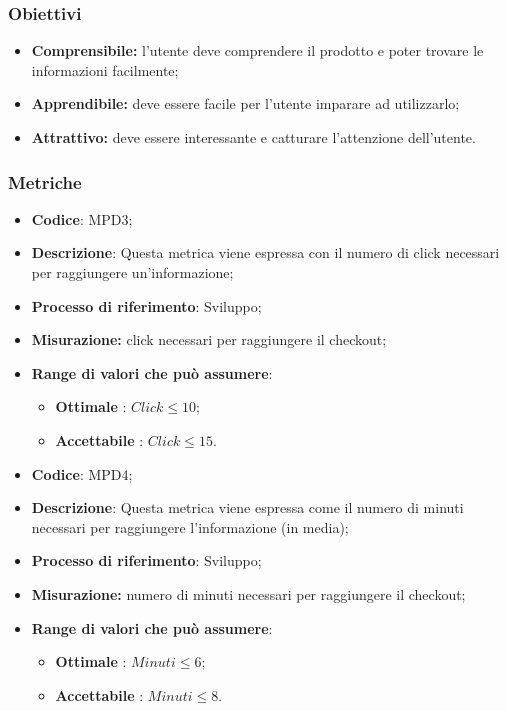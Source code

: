 \subsubsection{Obiettivi}
\begin {itemize}
	\item \textbf{Comprensibile:} l'utente deve comprendere il prodotto e poter trovare le informazioni facilmente;
	\item \textbf{Apprendibile:} deve essere facile per l'utente imparare ad utilizzarlo;
	\item \textbf{Attrattivo:} deve essere interessante e catturare l'attenzione dell'utente.
\end{itemize}
\subsubsection{Metriche}
\vspace{-1cm}
\begin{itemize}
	\item \textbf{Codice}: MPD3;
	\item \textbf{Descrizione}: Questa metrica viene espressa con il numero di click necessari per raggiungere un'informazione;
		\item \textbf{Processo di riferimento}: Sviluppo;
	\item \textbf{Misurazione:} click necessari per raggiungere il checkout;
	\item \textbf{Range di valori che può assumere}: 
		\begin{itemize}
			\item \textbf{Ottimale} : $Click \leq10$;
			\item \textbf{Accettabile} : $Click \leq15$.
		\end{itemize}
\end{itemize}
\vspace{-1cm}
\begin{itemize}
	\item \textbf{Codice}: MPD4;
	\item \textbf{Descrizione}: Questa metrica viene espressa come il numero di minuti necessari per raggiungere l'informazione (in media);
	\item \textbf{Processo di riferimento}: Sviluppo;
	\item \textbf{Misurazione:} numero di minuti necessari per raggiungere il checkout;
	\item \textbf{Range di valori che può assumere}: 
		\begin{itemize}
			\item \textbf{Ottimale} : $Minuti \leq6$;
			\item \textbf{Accettabile} : $Minuti \leq8$.
		\end{itemize}
\end{itemize}
